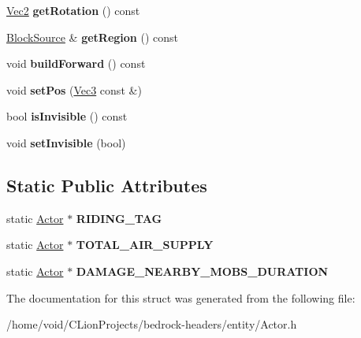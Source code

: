 \begin{DoxyCompactItemize}
\mbox{\hyperlink{struct_vec2}{Vec2}} {\bfseries get\+Rotation} () const
\item 
\mbox{\label{struct_actor_a3bad72ee07c91eaf74808ac2506c5587}} 
\mbox{\hyperlink{struct_block_source}{Block\+Source}} \& {\bfseries get\+Region} () const
\item 
\mbox{\label{struct_actor_a263df76e5ebfcb3f321df610cfd3f503}} 
void {\bfseries build\+Forward} () const
\item 
\mbox{\label{struct_actor_a69472d7d71622dece8207cfa23a5c3e1}} 
void {\bfseries set\+Pos} (\mbox{\hyperlink{struct_vec3}{Vec3}} const \&)
\item 
\mbox{\label{struct_actor_af241e75a4658f11b497e12292f366de3}} 
bool {\bfseries is\+Invisible} () const
\item 
\mbox{\label{struct_actor_af8f253f55a2de1609c0f11e95578a136}} 
void {\bfseries set\+Invisible} (bool)
\end{DoxyCompactItemize}
\subsection*{Static Public Attributes}
\begin{DoxyCompactItemize}
\item 
\mbox{\label{struct_actor_ae213c316f9d26464ebedd5cd7476a32b}} 
static \mbox{\hyperlink{struct_actor}{Actor}} $\ast$ {\bfseries R\+I\+D\+I\+N\+G\+\_\+\+T\+AG}
\item 
\mbox{\label{struct_actor_aa53acf414530c35cc795059a3f8bd5aa}} 
static \mbox{\hyperlink{struct_actor}{Actor}} $\ast$ {\bfseries T\+O\+T\+A\+L\+\_\+\+A\+I\+R\+\_\+\+S\+U\+P\+P\+LY}
\item 
\mbox{\label{struct_actor_a8cd3c8e7bfa4d68acb6a9359d47d9997}} 
static \mbox{\hyperlink{struct_actor}{Actor}} $\ast$ {\bfseries D\+A\+M\+A\+G\+E\+\_\+\+N\+E\+A\+R\+B\+Y\+\_\+\+M\+O\+B\+S\+\_\+\+D\+U\+R\+A\+T\+I\+ON}
\end{DoxyCompactItemize}


The documentation for this struct was generated from the following file\+:\begin{DoxyCompactItemize}
\item 
/home/void/\+C\+Lion\+Projects/bedrock-\/headers/entity/Actor.\+h\end{DoxyCompactItemize}
